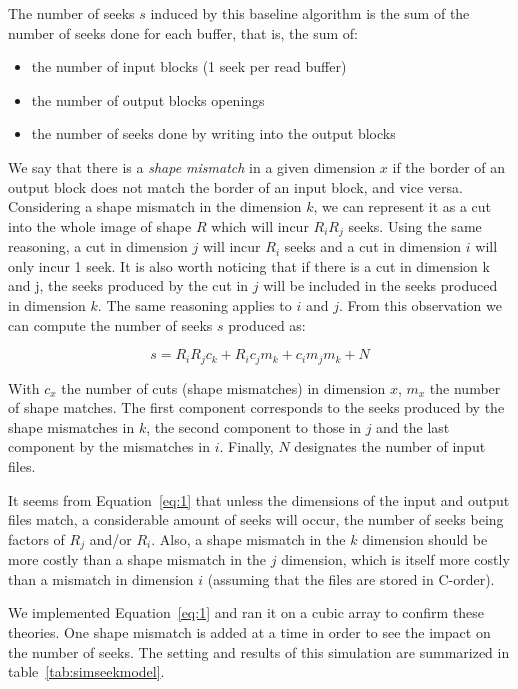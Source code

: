 \documentclass[conference]{IEEEtran}
\begin{document}
The number of seeks $s$ induced by this baseline algorithm is the
sum of the number of seeks done for each buffer, that is, the sum of:
\begin{itemize}
  \item the number of input blocks (1 seek per read buffer)
  \item the number of output blocks openings
  \item the number of seeks done by writing into the output blocks
\end{itemize}

We say that there is a \emph{shape mismatch} in a given dimension $x$ if the
border of an output block does not match the border of an input block, and
vice versa.
Considering a shape mismatch in the dimension $k$, we can represent it as a cut
into the whole image of shape $R$ which will incur $R_iR_j$ seeks. Using the
same reasoning, a cut in dimension $j$ will incur $R_i$ seeks and a cut in
dimension $i$ will only incur 1 seek.
It is also worth noticing that if there is a cut in dimension k and j, the seeks
produced by the cut in $j$ will be included in the seeks produced in dimension $k$.
The same reasoning applies to $i$ and $j$.
From this observation we can compute the number of seeks $s$ produced as:

\begin{equation} \label{eq:1}
s = R_i R_j c_k + R_i c_j m_k + c_i m_j m_k + N
\end{equation}

With $c_x$ the number of cuts (shape mismatches) in dimension $x$, $m_x$ the
number of shape matches. The first component corresponds to the seeks produced
by the shape mismatches in $k$, the second component to those in $j$ and the last
component by the mismatches in $i$. Finally, $N$ designates the number of input files.

It seems from Equation~\ref{eq:1} that unless the dimensions of the input and
output files match, a considerable amount of seeks will occur, the number of
seeks being factors of $R_j$ and/or $R_i$. Also, a shape mismatch in the
$k$ dimension should be more costly than a shape mismatch in the $j$ dimension,
which is itself more costly than a mismatch in dimension $i$ (assuming that the
files are stored in C-order).

We implemented Equation~\ref{eq:1} and ran it on a cubic array to confirm these
theories. One shape mismatch is added at a time in order to see the impact on
the number of seeks. The setting and results of this simulation are summarized
in table~\ref{tab:simseekmodel}.
\end{document}
